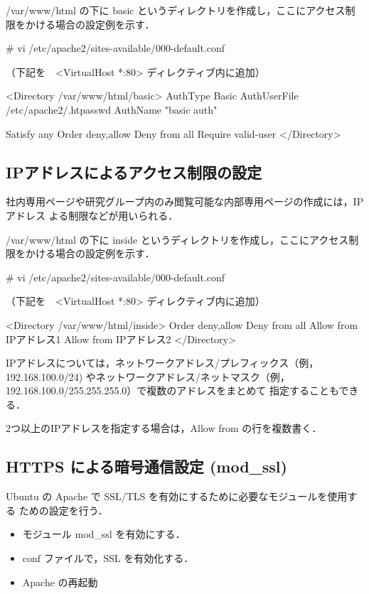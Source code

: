 /var/www/html の下に basic というディレクトリを作成し，ここにアクセス制
限をかける場合の設定例を示す．

\begin{cli}
# vi /etc/apache2/sites-available/000-default.conf

（下記を　<VirtualHost *:80> ディレクティブ内に追加）

<Directory /var/www/html/basic>
        AuthType Basic
        AuthUserFile /etc/apache2/.htpasswd
        AuthName "basic auth"
        
        Satisfy any
        Order deny,allow
        Deny from all
        Require valid-user
</Directory>
\end{cli}

\subsection{IPアドレスによるアクセス制限の設定}

社内専用ページや研究グループ内のみ閲覧可能な内部専用ページの作成には，IPアドレス
よる制限などが用いられる．

/var/www/html の下に inside というディレクトリを作成し，ここにアクセス制
限をかける場合の設定例を示す．

\begin{cli}
# vi /etc/apache2/sites-available/000-default.conf

（下記を　<VirtualHost *:80> ディレクティブ内に追加）

<Directory /var/www/html/inside>
        Order deny,allow
        Deny from all
        Allow from IPアドレス1
        Allow from IPアドレス2
</Directory>
\end{cli}

IPアドレスについては，ネットワークアドレス/プレフィックス（例，192.168.100.0/24)
やネットワークアドレス/ネットマスク（例，192.168.100.0/255.255.255.0）で複数のアドレスをまとめて
指定することもできる． 

2つ以上のIPアドレスを指定する場合は，Allow from の行を複数書く．




\subsection{HTTPS による暗号通信設定 (mod\_ssl)}

Ubuntu の Apache で SSL/TLS を有効にするために必要なモジュールを使用する
ための設定を行う．

\begin{itemize}
 \item モジュール mod\_ssl を有効にする．
 \item conf ファイルで，SSL を有効化する．
 \item Apache の再起動
\end{itemize}

